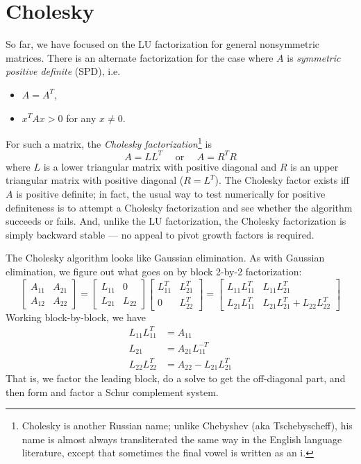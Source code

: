 \documentclass[12pt, leqno]{article}
\begin{document}

\section*{Cholesky}

So far, we have focused on the LU factorization for general
nonsymmetric matrices.  There is an alternate factorization
for the case where $A$ is {\em symmetric positive definite} (SPD),
i.e.
\begin{itemize}
\item $A = A^T$,
\item $x^T A x > 0$ for any $x \neq 0$.
\end{itemize}
For such a matrix, the {\em Cholesky factorization}\footnote{Cholesky
  is another Russian name; unlike Chebyshev (aka Tschebyscheff), his
  name is almost always transliterated the same way in the English
  language literature, except that sometimes the final vowel is
  written as an i.} is
\[
  A = LL^T \quad \mbox{ or } \quad A = R^T R
\]
where $L$ is a lower triangular matrix with positive diagonal and $R$
is an upper triangular matrix with positive diagonal ($R = L^T$).  The
Cholesky factor exists iff $A$ is positive definite; in fact, the
usual way to test numerically for positive definiteness is to attempt
a Cholesky factorization and see whether the algorithm succeeds or
fails.  And, unlike the LU factorization, the Cholesky factorization
is simply backward stable --- no appeal to pivot growth factors is required.

The Cholesky algorithm looks like Gaussian elimination.  As
with Gaussian elimination, we figure out what goes on
by block 2-by-2 factorization:
\[
\begin{bmatrix} A_{11} & A_{21} \\ A_{12} & A_{22} \end{bmatrix} =
\begin{bmatrix} L_{11} & 0 \\ L_{21} & L_{22} \end{bmatrix}
\begin{bmatrix} L_{11}^T & L_{21}^T \\ 0 & L_{22}^T \end{bmatrix} =
\begin{bmatrix}
  L_{11} L_{11}^T & L_{11} L_{21}^T \\
  L_{21} L_{11}^T & L_{21} L_{21}^T+ L_{22} L_{22}^T
\end{bmatrix}
\]
Working block-by-block, we have
\begin{align*}
  L_{11} L_{11}^T &= A_{11} \\
  L_{21} &= A_{21} L_{11}^{-T} \\
  L_{22} L_{22}^T &= A_{22} - L_{21} L_{21}^T
\end{align*}
That is, we factor the leading block, do a solve to get the
off-diagonal part, and then form and factor a Schur complement
system.
\end{document}
